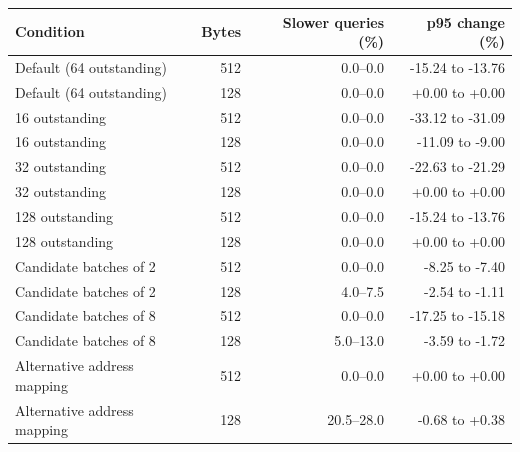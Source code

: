 \begin{tabular}{lrrr}
\toprule
Condition & Bytes & Slower queries (\%) & p95 change (\%) \\
\midrule
Default (64 outstanding) & 512 & 0.0--0.0 & -15.24 to -13.76 \\
Default (64 outstanding) & 128 & 0.0--0.0 & +0.00 to +0.00 \\
16 outstanding & 512 & 0.0--0.0 & -33.12 to -31.09 \\
16 outstanding & 128 & 0.0--0.0 & -11.09 to -9.00 \\
32 outstanding & 512 & 0.0--0.0 & -22.63 to -21.29 \\
32 outstanding & 128 & 0.0--0.0 & +0.00 to +0.00 \\
128 outstanding & 512 & 0.0--0.0 & -15.24 to -13.76 \\
128 outstanding & 128 & 0.0--0.0 & +0.00 to +0.00 \\
Candidate batches of 2 & 512 & 0.0--0.0 & -8.25 to -7.40 \\
Candidate batches of 2 & 128 & 4.0--7.5 & -2.54 to -1.11 \\
Candidate batches of 8 & 512 & 0.0--0.0 & -17.25 to -15.18 \\
Candidate batches of 8 & 128 & 5.0--13.0 & -3.59 to -1.72 \\
Alternative address mapping & 512 & 0.0--0.0 & +0.00 to +0.00 \\
Alternative address mapping & 128 & 20.5--28.0 & -0.68 to +0.38 \\
\bottomrule
\end{tabular}
